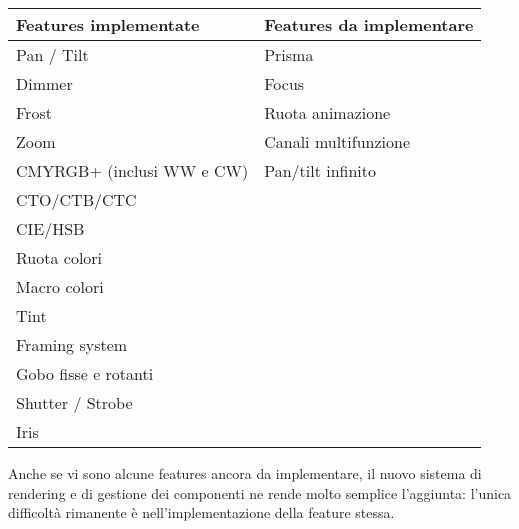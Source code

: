 \documentclass[main.tex]{subfiles}
\begin{document}
\noindent\begin{tabularx}{1\textwidth} { | >{\centering\arraybackslash}X | >{\centering\arraybackslash}X | }
    \hline
        \textbf{Features implementate}	& \textbf{Features da implementare}	\\
    \hline
        Pan / Tilt						& Prisma							\\
    \hline
        Dimmer							& Focus								\\
    \hline
        Frost							& Ruota animazione					\\
    \hline
        Zoom							& Canali multifunzione				\\
    \hline
        CMYRGB+ (inclusi WW e CW)		& Pan/tilt infinito					\\
    \hline
        CTO/CTB/CTC						& 									\\
    \hline
        CIE/HSB							& 									\\
    \hline
        Ruota colori					& 									\\
    \hline
        Macro colori					& 									\\
    \hline
        Tint							& 									\\
    \hline
        Framing system					& 									\\
    \hline
        Gobo fisse e rotanti			& 									\\
    \hline
        Shutter / Strobe				& 									\\
    \hline
        Iris							& 									\\
    \hline
\end{tabularx}
\newline

Anche se vi sono alcune features ancora da implementare, il nuovo sistema di rendering e di gestione dei componenti ne rende molto semplice l'aggiunta: l'unica difficoltà rimanente è nell'implementazione della feature stessa.
\end{document}
